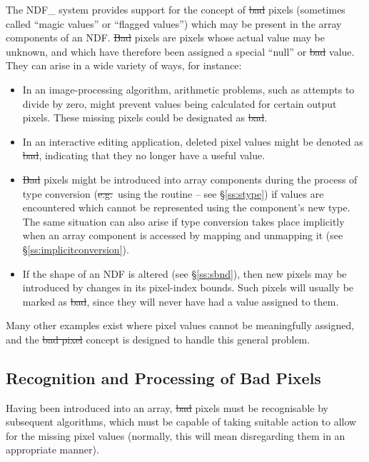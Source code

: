 The NDF\_ system provides support for the concept of \st{bad\/} pixels
(sometimes called ``magic values'' or ``flagged values'') which may be present
in the array components of an NDF. 
\st{Bad\/} pixels are pixels whose actual value may be unknown, and which
have therefore been assigned a special ``null'' or \st{bad\/} value. 
They can arise in a wide variety of ways, for instance:

\begin{itemize}

\item
In an image-processing algorithm, arithmetic problems, such as attempts to
divide by zero, might prevent values being calculated for certain output
pixels. 
These missing pixels could be designated as \st{bad}.

\item
In an interactive editing application, deleted pixel values might be denoted as
\st{bad}, indicating that they no longer have a useful value. 

\item
\st{Bad\/} pixels might be introduced into array components during the
process of type conversion (\st{e.g.}\ using the routine  -- see
\S\ref{ss:stype}) if values are encountered which cannot be represented
using the component's new type. 
The same situation can also arise if type conversion takes place implicitly
when an array component is accessed by mapping and unmapping it (see
\S\ref{ss:implicitconversion}). 

\item
If the shape of an NDF is altered (see \S\ref{ss:sbnd}), then new pixels may
be introduced by changes in its pixel-index bounds. 
Such pixels will usually be marked as \st{bad}, since they will never have
had a value assigned to them. 

\end{itemize}

Many other examples exist where pixel values cannot be meaningfully
assigned, and the \st{bad pixel\/} concept is designed to handle this general
problem. 

\subsection{Recognition and Processing of Bad Pixels}

Having been introduced into an array, \st{bad\/} pixels must be recognisable
by subsequent algorithms, which must be capable of taking suitable action to
allow for the missing pixel values (normally, this will mean disregarding
them in an appropriate manner). 

